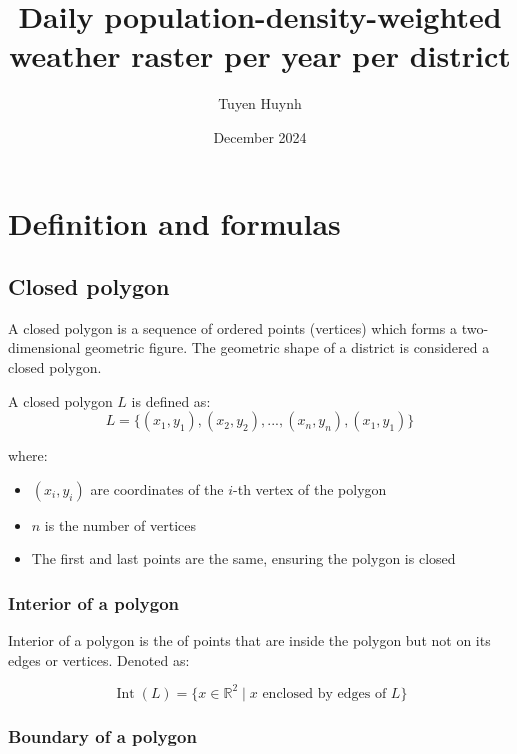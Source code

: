 \documentclass{article}
\title{Daily population-density-weighted weather raster per year per district}
\author{Tuyen Huynh}
\date{December 2024}
\begin{document}
\maketitle


\section{Definition and formulas}

\subsection{Closed polygon}

A closed polygon is a sequence of ordered points (vertices) which forms a two-dimensional geometric figure. The geometric shape of a district is considered a closed polygon.

A closed polygon $L$ is defined as:
\begin{equation*}
    L = \{(x_1, y_1), (x_2, y_2), ..., (x_n, y_n), (x_1, y_1)\}
\end{equation*}

where:
\begin{itemize}
    \item $(x_i, y_i)$ are coordinates of the $i$-th vertex of the polygon
    \item $n$ is the number of vertices
    \item The first and last points are the same, ensuring the polygon is closed
\end{itemize}

\subsubsection{Interior of a polygon}

Interior of a polygon is the of points that are inside the polygon but not on its edges or vertices. Denoted as:

\begin{equation} \label{eq:interior_poly}
    \operatorname{Int}(L) = \{x \in \mathbb{R}^2 \mid x \text{ enclosed by edges of } L\}
\end{equation}


\subsubsection{Boundary of a polygon}
\end{document}
